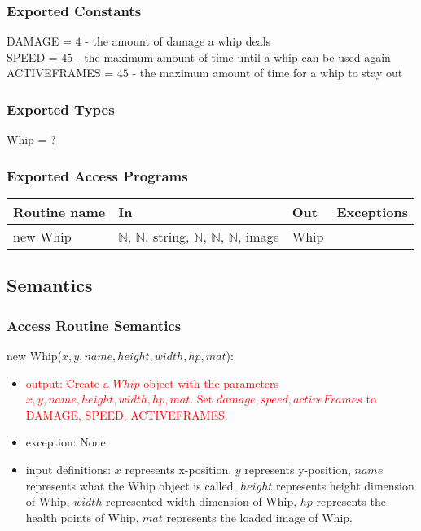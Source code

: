 \documentclass[12pt]{article}
\newcommand{\m}[1]{\mbox{#1}}
\begin{document}
\subsubsection*{Exported Constants}

DAMAGE = $4$ - the amount of damage a whip deals\\
SPEED = $45$ - the maximum amount of time until a whip can be used again\\
ACTIVEFRAMES = $45$ - the maximum amount of time for a whip to stay out

\subsubsection*{Exported Types}

Whip = ?

\subsubsection*{Exported Access Programs}

\begin{tabular}{| l | l | l | l |}
\hline
\textbf{Routine name} & \textbf{In} & \textbf{Out} & \textbf{Exceptions}\\
\hline
new Whip & $\mathbb{N}$, $\mathbb{N}$, string, $\mathbb{N}$, $\mathbb{N}$, $\mathbb{N}$, image & Whip & ~\\
\hline
\end{tabular}

\subsection*{Semantics}

\subsubsection*{Access Routine Semantics}

new Whip($x, y, name, height, width, hp, mat$):
\begin{itemize}
    \item \textcolor{red}{output: Create a $Whip$ object with the parameters $x, y, name, height, width, hp, mat$. Set $damage, speed, activeFrames$ to DAMAGE, SPEED, ACTIVEFRAMES.}
    \item exception: None
    \item input definitions: $x$ represents x-position, $y$ represents y-position, $name$ represents what the Whip object is called, $height$ represents height dimension of Whip, $width$ represented width dimension of Whip, $hp$ represents the health points of Whip, $mat$ represents the loaded image of Whip.
\end{itemize}
\end{document}
